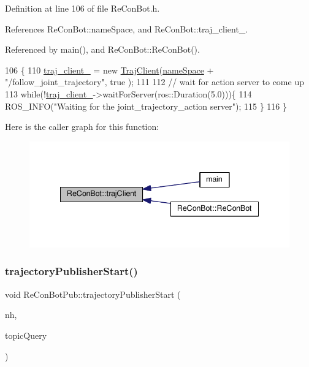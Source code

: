 Definition at line 106 of file Re\+Con\+Bot.\+h.



References Re\+Con\+Bot\+::name\+Space, and Re\+Con\+Bot\+::traj\+\_\+client\+\_\+.



Referenced by main(), and Re\+Con\+Bot\+::\+Re\+Con\+Bot().


\begin{DoxyCode}
106                          \{
110   \hyperlink{class_re_con_bot_a14a35ad6ca284af7db7228d7872720d1}{traj\_client\_} = \textcolor{keyword}{new} \hyperlink{_re_con_bot_8h_a6fb8875093261cdc69e54d3ac7d5c301}{TrajClient}(\hyperlink{class_re_con_bot_a40ca07cd606988b78664c4a52fd8dc59}{nameSpace} + \textcolor{stringliteral}{"/follow\_joint\_trajectory"}, \textcolor{keyword}{true}
      );
111 
112   \textcolor{comment}{// wait for action server to come up}
113   \textcolor{keywordflow}{while}(!\hyperlink{class_re_con_bot_a14a35ad6ca284af7db7228d7872720d1}{traj\_client\_}->waitForServer(ros::Duration(5.0)))\{
114   ROS\_INFO(\textcolor{stringliteral}{"Waiting for the joint\_trajectory\_action server"});
115   \}
116 \}
\end{DoxyCode}
Here is the caller graph for this function\+:
\nopagebreak
\begin{figure}[H]
\begin{center}
\leavevmode
\includegraphics[width=338pt]{d9/d0b/class_re_con_bot_ab859fa96532995d3c1545aaa9db1802e_icgraph}
\end{center}
\end{figure}
\mbox{\label{class_re_con_bot_pub_a2019b0d8d30f2419026c90dd30de500f}} 
\subsubsection{\texorpdfstring{trajectory\+Publisher\+Start()}{trajectoryPublisherStart()}}
{\footnotesize\ttfamily void Re\+Con\+Bot\+Pub\+::trajectory\+Publisher\+Start (\begin{DoxyParamCaption}\item[{ros\+::\+Node\+Handle \&}]{nh,  }\item[{int}]{topic\+Query }\end{DoxyParamCaption})}



